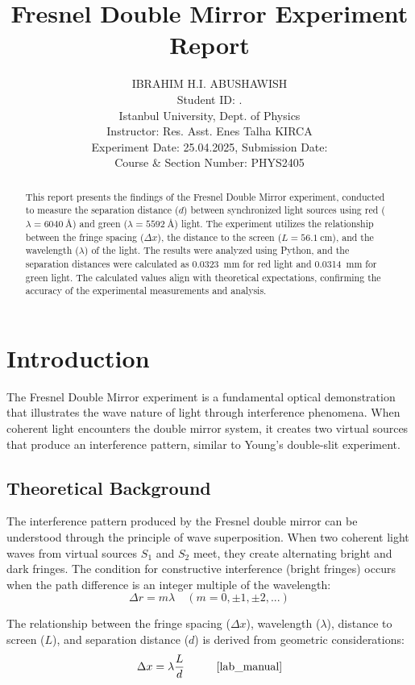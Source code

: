 \documentclass[journal]{IEEEtran}
\title{Fresnel Double Mirror Experiment Report}
\author{{\large IBRAHIM H.I. ABUSHAWISH} \\ 
{\small Student ID: \hspace{1.5cm}. \\ 
Istanbul University, Dept. of Physics \\ 
Instructor: Res. Asst. Enes Talha KIRCA \\ 
Experiment Date: 25.04.2025, Submission Date: \\ 
Course \& Section Number: PHYS2405}
}
\begin{document}
\maketitle
\begin{abstract}
    This report presents the findings of the Fresnel Double Mirror experiment, conducted to measure the separation distance ($d$) between synchronized light sources using red ($\lambda = \SI{6040}{\angstrom}$) and green ($\lambda = \SI{5592}{\angstrom}$) light. The experiment utilizes the relationship between the fringe spacing ($\Delta x$), the distance to the screen ($L = \SI{56.1}{\centi\meter}$), and the wavelength ($\lambda$) of the light. The results were analyzed using Python, and the separation distances were calculated as \SI{0.0323}{\milli\meter} for red light and \SI{0.0314}{\milli\meter} for green light. The calculated values align with theoretical expectations, confirming the accuracy of the experimental measurements and analysis.
\end{abstract}

\section{Introduction}
The Fresnel Double Mirror experiment is a fundamental optical demonstration that illustrates the wave nature of light through interference phenomena. When coherent light encounters the double mirror system, it creates two virtual sources that produce an interference pattern, similar to Young's double-slit experiment.

\subsection{Theoretical Background}
The interference pattern produced by the Fresnel double mirror can be understood through the principle of wave superposition. When two coherent light waves from virtual sources $S_1$ and $S_2$ meet, they create alternating bright and dark fringes. The condition for constructive interference (bright fringes) occurs when the path difference is an integer multiple of the wavelength:
\begin{equation}
    \Delta r = m\lambda \quad (m = 0, \pm1, \pm2, ...)
\end{equation}

The relationship between the fringe spacing ($\Delta x$), wavelength ($\lambda$), distance to screen ($L$), and separation distance ($d$) is derived from geometric considerations:
\begin{equation}
    \Delta x = \lambda \frac{L}{d} \hspace{1cm} \cite{lab_manual}
\end{equation}
\end{document}
